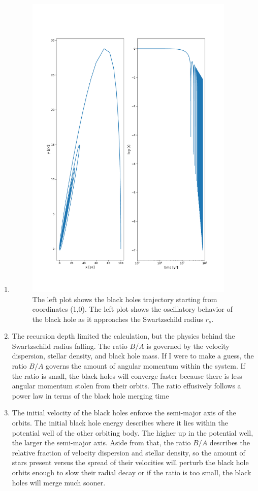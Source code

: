 \documentclass{article}
\begin{document}
\begin{enumerate}
{\begin{enumerate}
{        I guessed a value of $\delta = 10^{-6}$.}
        \item{
        \begin{figure}[h!]
            \centering
            \includegraphics[width=\textwidth, height=15cm]{Bh_trajectory_xy.pdf}
            \caption{The left plot shows the black holes trajectory starting from coordinates (1,0). The left plot shows the oscillatory behavior of the black hole as it approaches the Swartzschild radius $r_s$. }
            \label{fig:my_label}
        \end{figure}
        }
        \item{The recursion depth limited the calculation, but the physics behind the Swartzschild radius falling. The ratio $B/A$ is governed by the velocity dispersion, stellar density, and black hole mass. If I were to make a guess, the ratio $B/A$ governs the amount of angular momentum within the system. If the ratio is small, the black holes will converge faster because there is less angular momentum stolen from their orbits. The ratio effusively follows a power law in terms of the black hole merging time}
        \item{The initial velocity of the black holes enforce the semi-major axis of the orbits. The initial black hole energy describes where it lies within the potential well of the other orbiting body. The higher up in the potential well, the larger the semi-major axis. Aside from that, the ratio $B/A$ describes the relative fraction of velocity dispersion and stellar density, so the amount of stars present versus the spread of their velocities will perturb the black hole orbits enough to slow their radial decay or if the ratio is too small, the black holes will merge much sooner.}
    \end{enumerate}
    }
\end{enumerate}
\end{document}

